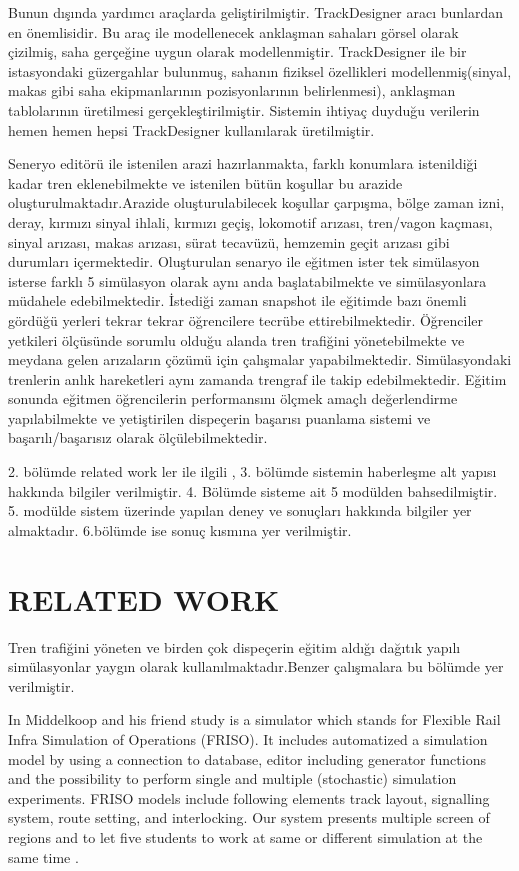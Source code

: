 \documentclass[conference]{IEEEtran}
\begin{document}
Bunun dışında yardımcı araçlarda geliştirilmiştir. TrackDesigner aracı bunlardan en önemlisidir. Bu araç ile modellenecek anklaşman sahaları görsel olarak çizilmiş, saha gerçeğine uygun olarak modellenmiştir. TrackDesigner ile bir istasyondaki güzergahlar bulunmuş, sahanın fiziksel özellikleri modellenmiş(sinyal, makas gibi saha ekipmanlarının pozisyonlarının belirlenmesi), anklaşman tablolarının üretilmesi gerçekleştirilmiştir. Sistemin ihtiyaç duyduğu verilerin hemen hemen hepsi TrackDesigner kullanılarak üretilmiştir.


Seneryo editörü ile istenilen arazi hazırlanmakta, farklı konumlara istenildiği kadar tren eklenebilmekte ve istenilen bütün koşullar bu arazide oluşturulmaktadır.Arazide oluşturulabilecek koşullar çarpışma, bölge zaman izni, deray, kırmızı sinyal ihlali, kırmızı geçiş, lokomotif arızası, tren/vagon kaçması, sinyal arızası, makas arızası, sürat tecavüzü, hemzemin geçit arızası gibi durumları içermektedir. Oluşturulan senaryo ile eğitmen ister tek simülasyon isterse farklı 5 simülasyon olarak aynı anda başlatabilmekte ve simülasyonlara müdahele edebilmektedir. İstediği zaman snapshot ile eğitimde bazı önemli gördüğü yerleri tekrar tekrar öğrencilere tecrübe ettirebilmektedir. Öğrenciler yetkileri ölçüsünde sorumlu olduğu alanda tren trafiğini yönetebilmekte ve meydana gelen arızaların çözümü için çalışmalar yapabilmektedir. Simülasyondaki trenlerin anlık hareketleri aynı zamanda trengraf ile takip edebilmektedir. Eğitim sonunda eğitmen öğrencilerin performansını ölçmek amaçlı değerlendirme yapılabilmekte ve yetiştirilen dispeçerin başarısı puanlama sistemi ve başarılı/başarısız olarak ölçülebilmektedir.


2. bölümde related work ler ile ilgili , 3. bölümde sistemin haberleşme alt yapısı hakkında bilgiler verilmiştir. 4. Bölümde sisteme ait 5 modülden bahsedilmiştir. 5. modülde sistem üzerinde yapılan deney ve sonuçları hakkında bilgiler yer almaktadır. 6.bölümde ise sonuç kısmına yer verilmiştir.




\section{RELATED WORK}


Tren trafiğini yöneten ve birden çok dispeçerin eğitim aldığı dağıtık yapılı simülasyonlar yaygın olarak kullanılmaktadır.Benzer çalışmalara bu bölümde yer verilmiştir.


In Middelkoop and his friend study is a simulator which stands for Flexible Rail Infra Simulation of Operations (FRISO). It includes automatized  a simulation model by using a connection to database, editor including generator functions and the possibility to perform single and multiple (stochastic) simulation experiments. FRISO models include following elements  track layout, signalling system, route setting, and interlocking. Our system presents multiple screen of regions and to let five students to work at same or different simulation at the same time \cite{FRISO}.
\end{document}
